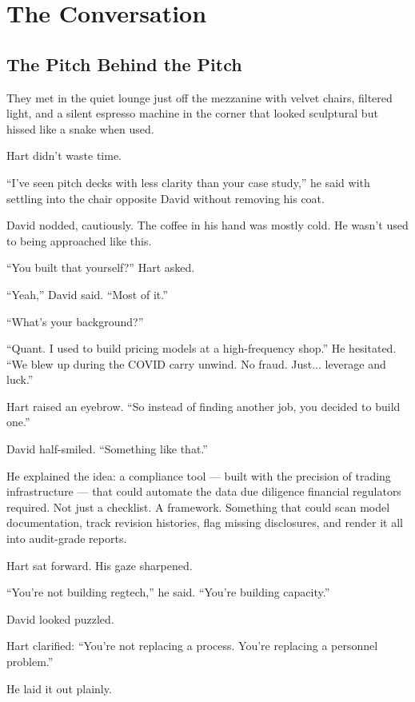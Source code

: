 
\section{The Conversation}

\subsection{The Pitch Behind the Pitch}

They met in the quiet lounge just off the mezzanine with
velvet chairs, filtered light, and a silent espresso machine in the corner that looked sculptural but hissed like a 
snake when used. 

Hart didn’t waste time.

``I’ve seen pitch decks with less clarity than your case study,'' he said with settling into the chair opposite David 
without removing his coat.

David nodded, cautiously. The coffee in his hand was mostly cold. He wasn’t used to being approached like this.

``You built that yourself?'' Hart asked.

``Yeah,'' David said. ``Most of it.''

``What’s your background?''

``Quant. I used to build pricing models at a high-frequency shop.'' 
He hesitated. ``We blew up during the COVID carry unwind. No fraud. Just... leverage and luck.''

Hart raised an eyebrow. ``So instead of finding another job, you decided to build one.''

David half-smiled. ``Something like that.''

He explained the idea: a compliance tool --- built with the precision of trading infrastructure --- that could 
automate the data due diligence financial regulators required.  
Not just a checklist. A framework. Something that could scan model documentation, track revision histories, flag 
missing disclosures, and render it all into audit-grade reports.

Hart sat forward. His gaze sharpened.

``You’re not building regtech,'' he said. ``You’re building capacity.''

David looked puzzled.

Hart clarified: ``You’re not replacing a process. You’re replacing a personnel problem.''

He laid it out plainly. 

